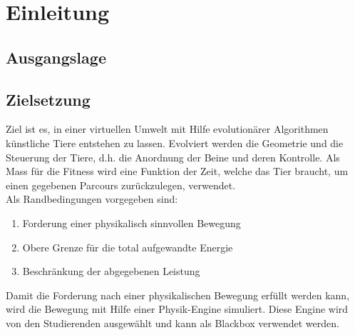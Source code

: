 %
%


\chapter{Einleitung}
\lipsum[33-37]
\section{Ausgangslage}
\lipsum[5-9]
\section{Zielsetzung}
Ziel ist es, in einer virtuellen Umwelt mit Hilfe evolutionärer Algorithmen künstliche Tiere entstehen zu lassen.
Evolviert werden die Geometrie und die Steuerung der Tiere, d.h. die Anordnung der Beine und deren Kontrolle.
Als Mass für die Fitness wird eine Funktion der Zeit, welche das Tier braucht,
um einen gegebenen Parcours zurückzulegen, verwendet.\\
Als Randbedingungen vorgegeben sind:
\begin{enumerate}
  \item Forderung einer physikalisch sinnvollen Bewegung
  \item Obere Grenze für die total aufgewandte Energie
  \item Beschränkung der abgegebenen Leistung
\end{enumerate}
Damit die Forderung nach einer physikalischen Bewegung erfüllt werden kann,
wird die Bewegung mit Hilfe einer Physik-Engine simuliert.
Diese Engine wird von den Studierenden ausgewählt und kann als Blackbox verwendet werden.

